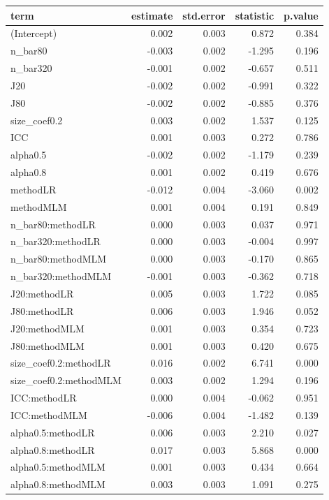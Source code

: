 \documentclass[
]{book}
\begin{document}
\begin{tabular}{l|r|r|r|r}
\hline
term & estimate & std.error & statistic & p.value\\
\hline
(Intercept) & 0.002 & 0.003 & 0.872 & 0.384\\
\hline
n\_bar80 & -0.003 & 0.002 & -1.295 & 0.196\\
\hline
n\_bar320 & -0.001 & 0.002 & -0.657 & 0.511\\
\hline
J20 & -0.002 & 0.002 & -0.991 & 0.322\\
\hline
J80 & -0.002 & 0.002 & -0.885 & 0.376\\
\hline
size\_coef0.2 & 0.003 & 0.002 & 1.537 & 0.125\\
\hline
ICC & 0.001 & 0.003 & 0.272 & 0.786\\
\hline
alpha0.5 & -0.002 & 0.002 & -1.179 & 0.239\\
\hline
alpha0.8 & 0.001 & 0.002 & 0.419 & 0.676\\
\hline
methodLR & -0.012 & 0.004 & -3.060 & 0.002\\
\hline
methodMLM & 0.001 & 0.004 & 0.191 & 0.849\\
\hline
n\_bar80:methodLR & 0.000 & 0.003 & 0.037 & 0.971\\
\hline
n\_bar320:methodLR & 0.000 & 0.003 & -0.004 & 0.997\\
\hline
n\_bar80:methodMLM & 0.000 & 0.003 & -0.170 & 0.865\\
\hline
n\_bar320:methodMLM & -0.001 & 0.003 & -0.362 & 0.718\\
\hline
J20:methodLR & 0.005 & 0.003 & 1.722 & 0.085\\
\hline
J80:methodLR & 0.006 & 0.003 & 1.946 & 0.052\\
\hline
J20:methodMLM & 0.001 & 0.003 & 0.354 & 0.723\\
\hline
J80:methodMLM & 0.001 & 0.003 & 0.420 & 0.675\\
\hline
size\_coef0.2:methodLR & 0.016 & 0.002 & 6.741 & 0.000\\
\hline
size\_coef0.2:methodMLM & 0.003 & 0.002 & 1.294 & 0.196\\
\hline
ICC:methodLR & 0.000 & 0.004 & -0.062 & 0.951\\
\hline
ICC:methodMLM & -0.006 & 0.004 & -1.482 & 0.139\\
\hline
alpha0.5:methodLR & 0.006 & 0.003 & 2.210 & 0.027\\
\hline
alpha0.8:methodLR & 0.017 & 0.003 & 5.868 & 0.000\\
\hline
alpha0.5:methodMLM & 0.001 & 0.003 & 0.434 & 0.664\\
\hline
alpha0.8:methodMLM & 0.003 & 0.003 & 1.091 & 0.275\\
\hline
\end{tabular}
\end{document}
